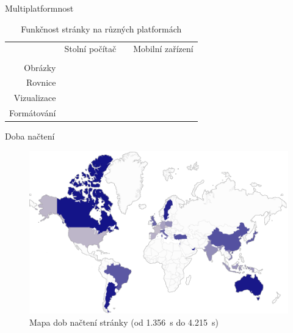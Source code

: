 \documentclass[14pt, hyperref={unicode}]{beamer}
\newcommand{\Firefox}{\faIcon{firefox}}
\newcommand{\Chrome}{\faIcon{chrome}}
\newcommand{\IE}{\faIcon{internet-explorer}}
\newcommand{\Edge}{\faIcon{edge}}
\newcommand{\Safari}{\faIcon{safari}}
\newcommand{\Opera}{\faIcon{opera}}
\newcommand{\Yes}{\faIcon{check}}
\newcommand{\No}{\faIcon{times}}
\newcommand{\NA}{\faIcon{minus}}
\begin{document}
  \begin{frame}{Multiplatformnost}
    \begin{minipage}[b]{\textwidth}
      \begin{table}[H]
        \caption{Funkčnost stránky na různých platformách}
        \scriptsize
        \centering
        \begin{tabular}{@{}rccccccccccccc@{}}
          \toprule
            & \multicolumn{6}{c}{Stolní počítač} & \phantom{abc} & \multicolumn{6}{c}{Mobilní zařízení} \\
          \cmidrule{2-7} \cmidrule{9-14}
            & \Firefox & \Chrome & \IE & \Edge & \Safari & \Opera && \Firefox & \Chrome & \IE & \Edge & \Safari & \Opera \\
          \midrule
            Obrázky     & \Yes & \Yes & \Yes & \Yes & \Yes & \Yes && \Yes & \Yes & \NA & \Yes & \Yes & \Yes \\
            Rovnice     & \Yes & \Yes & \Yes & \Yes & \Yes & \Yes && \Yes & \Yes & \NA & \Yes & \Yes & \Yes \\
            Vizualizace & \Yes & \Yes & \No  & \Yes & \Yes & \Yes && \Yes & \Yes & \NA & \Yes & \Yes & \Yes \\
            Formátování & \Yes & \Yes & \Yes & \Yes & \Yes & \Yes && \Yes & \Yes & \NA & \Yes & \Yes & \Yes \\
          \bottomrule
        \end{tabular}
      \end{table}
    \end{minipage}
  \end{frame}

  \begin{frame}{Doba načtení}
    \begin{figure}[H]
      \includegraphics[width=\textwidth,height=0.7\textheight,keepaspectratio]{map.png}
      \caption{Mapa dob načtení stránky (od \SI{1.356}{\second} do \SI{4.215}{\second})}
    \end{figure}
  \end{frame}
\end{document}
